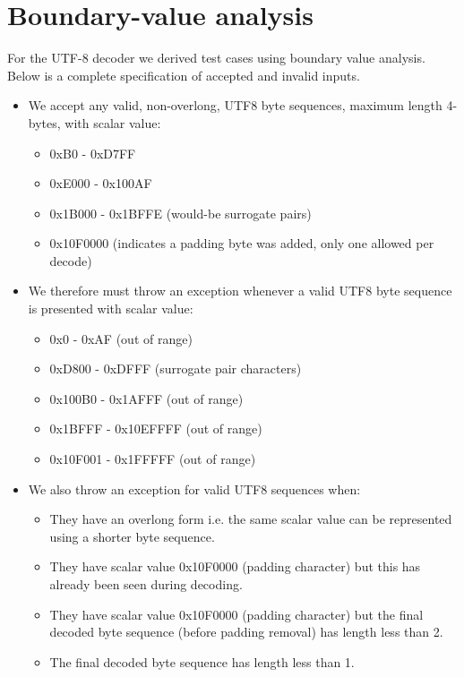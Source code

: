 \chapter{Boundary-value analysis}
\label{app:bv}

For the UTF-8 decoder we derived test cases using boundary value analysis. Below is a complete specification of accepted and invalid inputs.

\begin{itemize}
        \item We accept any valid, non-overlong, UTF8 byte sequences, maximum length 4-bytes, with scalar value:
        \begin{itemize}
            \item 0xB0 - 0xD7FF
            \item 0xE000 - 0x100AF
            \item 0x1B000 - 0x1BFFE (would-be surrogate pairs)
            \item 0x10F0000 (indicates a padding byte was added, only one allowed per decode)
        \end{itemize}
        \item We therefore must throw an exception whenever a valid UTF8 byte sequence is presented with scalar value:
        \begin{itemize}
            \item 0x0 - 0xAF (out of range)
            \item 0xD800 - 0xDFFF (surrogate pair characters)
            \item 0x100B0 - 0x1AFFF (out of range)
            \item 0x1BFFF - 0x10EFFFF (out of range)
            \item 0x10F001 - 0x1FFFFF (out of range)
        \end{itemize}
        \item We also throw an exception for valid UTF8 sequences when:
        \begin{itemize}
            \item They have an overlong form i.e. the same scalar value can be represented using a shorter byte sequence.
            \item They have scalar value 0x10F0000 (padding character) but this has already been seen during decoding.
            \item They have scalar value 0x10F0000 (padding character) but the final decoded byte sequence (before padding removal) has length less than 2.
            \item The final decoded byte sequence has length less than 1.

\end{itemize}
\end{itemize}
